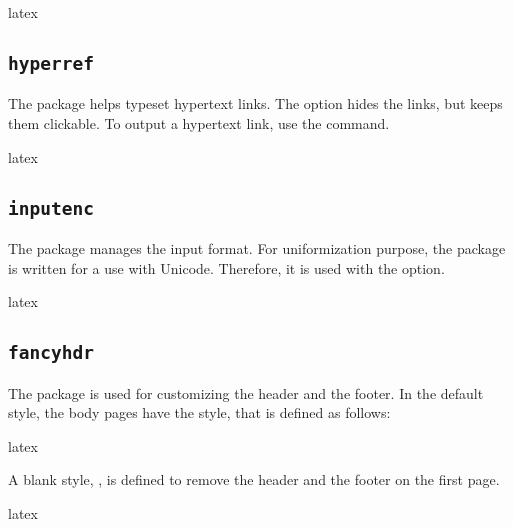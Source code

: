 \documentclass{report}
\begin{document}
\begin{imtaCode}{latex}
\RequirePackage[T1]{fontenc}
\end{imtaCode}


\subsection{\texttt{hyperref}}
The  package helps typeset hypertext links.
The  option hides the links, but keeps them clickable.
To output a hypertext link, use the  command.

\begin{imtaCode}{latex}
\RequirePackage[hidelinks]{hyperref}
\end{imtaCode}


\subsection{\texttt{inputenc}}
The  package manages the input format.
For uniformization purpose, the  package is written for a use with Unicode.
Therefore, it is used with the  option.

\begin{imtaCode}{latex}
\RequirePackage[utf8]{inputenc}
\end{imtaCode}


\subsection{\texttt{fancyhdr}}
The  package is used for customizing the header and the footer.
In the default style, the body pages have the  style, that is defined as follows:

\begin{imtaCode}{latex}
\pagestyle{fancy}
\fancyhead{}
\fancyfoot{}
\fancyhead[L]{\thetitle}
\fancyhead[R]{\imtaTheAuthorShort}
\fancyfoot[C]{\thepage}
\end{imtaCode}

A blank style, , is defined to remove the header and the footer on the first page.

\begin{imtaCode}{latex}
\end{imtaCode}
\end{document}
